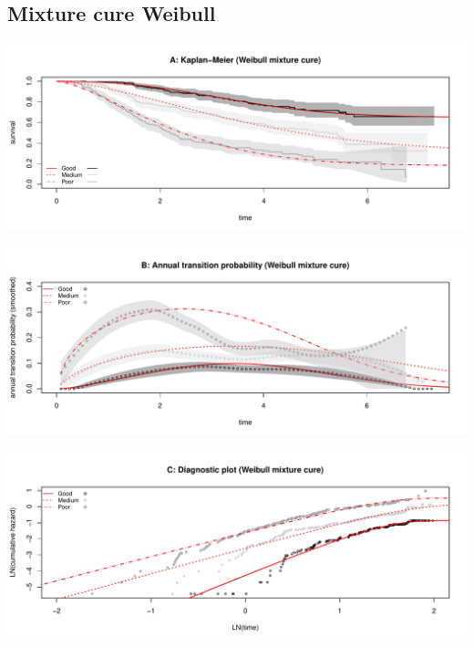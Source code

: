 \documentclass[]{article}
\begin{document}
\newpage

\subsection{Mixture cure Weibull}\label{mixture-cure-weibull}

\begin{flushleft}\includegraphics[height=0.25\textheight]{Images/cure_weib_mix-1} \end{flushleft}

\begin{flushleft}\includegraphics[height=0.25\textheight]{Images/cure_weib_mix-2} \end{flushleft}

\begin{flushleft}\includegraphics[height=0.25\textheight]{Images/cure_weib_mix-3} \end{flushleft}

\newpage
\end{document}
